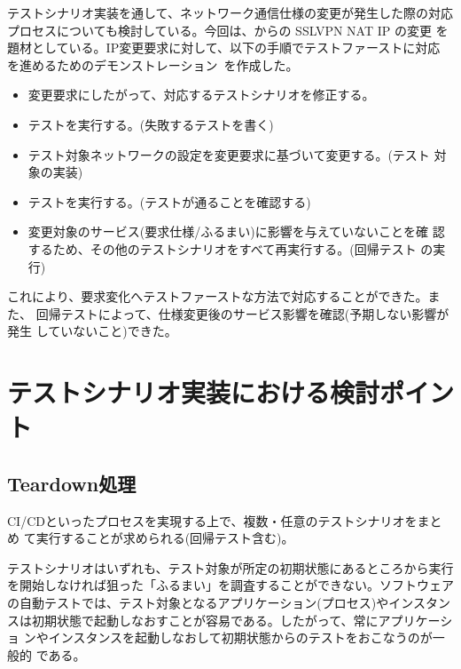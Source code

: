テストシナリオ実装を通して、ネットワーク通信仕様の変更が発生した際の対応
プロセスについても検討している。今回は、\tj からの SSLVPN NAT IP の変更
を題材としている。IP変更要求に対して、以下の手順でテストファーストに対応
を進めるためのデモンストレーション~\cite{nettester-demo-movie}を作成した。
\begin{itemize}
 \item 変更要求にしたがって、対応するテストシナリオを修正する。
 \item テストを実行する。(失敗するテストを書く)
 \item テスト対象ネットワークの設定を変更要求に基づいて変更する。(テスト
       対象の実装)
 \item テストを実行する。(テストが通ることを確認する)
 \item 変更対象のサービス(要求仕様/ふるまい)に影響を与えていないことを確
       認するため、その他のテストシナリオをすべて再実行する。(回帰テスト
       の実行)
\end{itemize}
これにより、要求変化へテストファーストな方法で対応することができた。また、
回帰テストによって、仕様変更後のサービス影響を確認(予期しない影響が発生
していないこと)できた。

 \section{テストシナリオ実装における検討ポイント}
 \label{sec:testscenario-impl-point}

  \subsection{Teardown処理}
  \label{sec:teardown}
CI/CDといったプロセスを実現する上で、複数・任意のテストシナリオをまとめ
て実行することが求められる(回帰テスト含む)。

テストシナリオはいずれも、テスト対象が所定の初期状態にあるところから実行
を開始しなければ狙った「ふるまい」を調査することができない。ソフトウェア
の自動テストでは、テスト対象となるアプリケーション(プロセス)やインスタン
スは初期状態で起動しなおすことが容易である。したがって、常にアプリケーショ
ンやインスタンスを起動しなおして初期状態からのテストをおこなうのが一般的
である。

